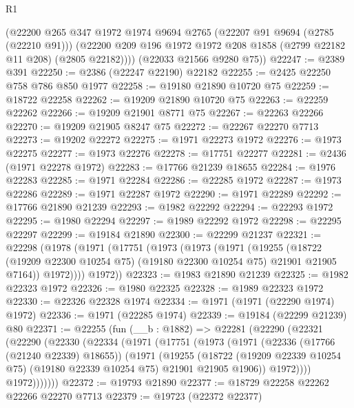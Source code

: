 \begin{lexlean}{R1}
\begin{coremodule}
        (@22200
          @265
          @347
          @1972
          @1974
          @9694
          @2765
          (@22207 @91 @9694 (@2785 (@22210 @91)))
          (@22200 @209 @196 @1972 @1972 @208 @1858 (@2799 @22182 @11 @208) (@2805 @22182))))
      (@22033 @21566 @9280 @75))
@22247 := @2389 @391
@22250 := @2386 (@22247 @22190) @22182
@22255 := @2425 @22250 @758 @786 @850 @1977
@22258 := @19180 @21890 @10720 @75
@22259 := @18722 @22258
@22262 := @19209 @21890 @10720 @75
@22263 := @22259 @22262
@22266 := @19209 @21901 @8771 @75
@22267 := @22263 @22266
@22270 := @19209 @21905 @8247 @75
@22272 := @22267 @22270 @7713
@22273 := @19202 @22272
@22275 := @1971 @22273 @1972
@22276 := @1973 @22275
@22277 := @1973 @22276
@22278 := @17751 @22277
@22281 := @2436 (@1971 @22278 @1972)
@22283 := @17766 @21239 @18655
@22284 := @1976 @22283
@22285 := @1971 @22284
@22286 := @22285 @1972
@22287 := @1973 @22286
@22289 := @1971 @22287 @1972
@22290 := @1971 @22289
@22292 := @17766 @21890 @21239
@22293 := @1982 @22292
@22294 := @22293 @1972
@22295 := @1980 @22294
@22297 := @1989 @22292 @1972
@22298 := @22295 @22297
@22299 := @19184 @21890
@22300 := @22299 @21237
@22321 := @22298
    (@1978
      (@1971
        (@17751
          (@1973
            (@1973
              (@1971
                (@19255
                  (@18722
                    (@19209 @22300 @10254 @75)
                    (@19180 @22300 @10254 @75)
                    @21901
                    @21905
                    @7164))
                @1972))))
        @1972))
@22323 := @1983 @21890 @21239
@22325 := @1982 @22323 @1972
@22326 := @1980 @22325
@22328 := @1989 @22323 @1972
@22330 := @22326 @22328 @1974
@22334 := @1971 (@1971 (@22290 @1974) @1972)
@22336 := @1971 (@22285 @1974)
@22339 := @19184 (@22299 @21239) @80
@22371 := @22255
    (fun (__b : @1882) =>
    @22281
      (@22290
        (@22321
          (@22290
            (@22330
              (@22334
                (@1971
                  (@17751
                    (@1973
                      (@1971
                        (@22336 (@17766 (@21240 @22339) @18655))
                        (@1971
                          (@19255
                            (@18722
                              (@19209 @22339 @10254 @75)
                              (@19180 @22339 @10254 @75)
                              @21901
                              @21905
                              @1906))
                          @1972))))
                  @1972)))))))
@22372 := @19793 @21890
@22377 := @18729 @22258 @22262 @22266 @22270 @7713
@22379 := @19723 (@22372 @22377)

\end{coremodule}
\end{lexlean}
